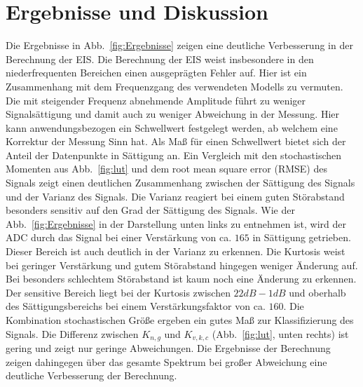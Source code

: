 \section{Ergebnisse und Diskussion}
Die Ergebnisse in Abb.~\ref{fig:Ergebnisse} zeigen eine deutliche Verbesserung in der Berechnung der EIS. Die Berechnung der EIS weist insbesondere in den niederfrequenten Bereichen einen ausgeprägten Fehler auf. Hier ist ein Zusammenhang mit dem Frequenzgang des verwendeten Modells zu vermuten. Die mit steigender Frequenz abnehmende Amplitude führt zu weniger Signalsättigung und damit auch zu weniger Abweichung in der Messung. Hier kann anwendungsbezogen ein Schwellwert festgelegt werden, ab welchem eine Korrektur der Messung Sinn hat. Als Maß für einen Schwellwert bietet sich der Anteil der Datenpunkte in Sättigung an. Ein Vergleich mit den stochastischen Momenten aus Abb.~\ref{fig:lut} und dem root mean square error (RMSE) des Signals zeigt einen deutlichen Zusammenhang zwischen der Sättigung des Signals und der Varianz des Signals. Die Varianz reagiert bei einem guten Störabstand besonders sensitiv auf den Grad der Sättigung des Signals. Wie der Abb.~\ref{fig:Ergebnisse} in der Darstellung unten links zu entnehmen ist, wird der ADC durch das Signal bei einer Verstärkung von ca. $165$ in Sättigung getrieben. Dieser Bereich ist auch deutlich in der Varianz zu erkennen. Die Kurtosis weist bei geringer Verstärkung und gutem Störabstand hingegen weniger Änderung auf. Bei besonders schlechtem Störabstand ist kaum noch eine Änderung zu erkennen. Der sensitive Bereich liegt bei der Kurtosis zwischen $22dB - 1dB$ und oberhalb des Sättigungsbereichs bei einem Verstärkungsfaktor von ca. $160$. Die Kombination stochastischen Größe ergeben ein gutes Maß zur Klassifizierung des Signals. Die Differenz zwischen $K_{n,g}$ und $K_{v,k,c}$ (Abb.~\ref{fig:lut}, unten rechts) ist gering und zeigt nur geringe Abweichungen. Die Ergebnisse der Berechnung zeigen dahingegen über das gesamte Spektrum bei großer Abweichung eine deutliche Verbesserung der Berechnung.
